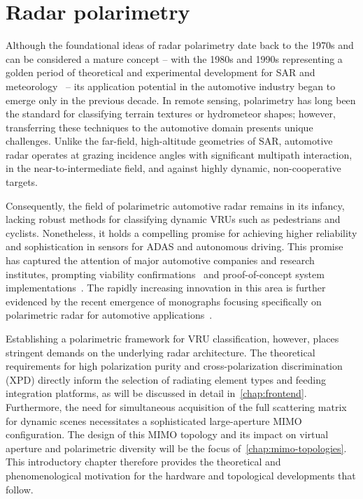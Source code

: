 \chapter{Radar polarimetry}
\label{chap:radar_polarimetry}

Although the foundational ideas of radar polarimetry date back to the 1970s and can be considered a mature concept -- with the 1980s and 1990s representing a golden period of theoretical and experimental development for SAR and meteorology~\parencite{leePolarimetricRadarImaging2017} -- its application potential in the automotive industry began to emerge only in the previous decade.
In remote sensing, polarimetry has long been the standard for classifying terrain textures or hydrometeor shapes; however, transferring these techniques to the automotive domain presents unique challenges.
Unlike the far-field, high-altitude geometries of SAR, automotive radar operates at grazing incidence angles with significant multipath interaction, in the near-to-intermediate field, and against highly dynamic, non-cooperative targets.

Consequently, the field of polarimetric automotive radar remains in its infancy, lacking robust methods for classifying dynamic VRUs such as pedestrians and cyclists.
Nonetheless, it holds a compelling promise for achieving higher reliability and sophistication in sensors for ADAS and autonomous driving.
This promise has captured the attention of major automotive companies and research institutes, prompting viability confirmations~\parencite{tillyRoadUserClassification2021} and proof-of-concept system implementations~\parencite{tintiFullyPolarimetricAutomotive2024}.
The rapidly increasing innovation in this area is further evidenced by the recent emergence of monographs focusing specifically on polarimetric radar for automotive applications~\parencite{visentinPolarimetricRadarAutomotive2019}.

Establishing a polarimetric framework for VRU classification, however, places stringent demands on the underlying radar architecture.
The theoretical requirements for high polarization purity and cross-polarization discrimination (XPD) directly inform the selection of radiating element types and feeding integration platforms, as will be discussed in detail in~\cref{chap:frontend}.
Furthermore, the need for simultaneous acquisition of the full scattering matrix for dynamic scenes necessitates a sophisticated large-aperture MIMO configuration.
The design of this MIMO topology and its impact on virtual aperture and polarimetric diversity will be the focus of~\cref{chap:mimo-topologies}.
This introductory chapter therefore provides the theoretical and phenomenological motivation for the hardware and topological developments that follow.

